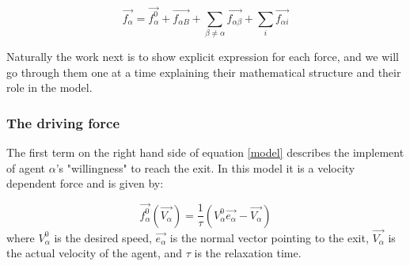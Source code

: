 \begin{equation}\label{model}
    \vec{f_{\alpha}} = \vec{f^{0}_{\alpha}} + \vec{f_{\alpha B}} +
    \sum_{\beta \neq \alpha} \vec{f_{\alpha \beta}} +  
    \sum_{i} \vec{f_{\alpha i}} 
\end{equation}

Naturally the work next is to show explicit expression for each force, and we will go through them one at a time explaining their mathematical structure and their role in the model.\\

\subsubsection{The driving force} %
The first term on the right hand side of equation \eqref{model} describes the implement of agent $ \alpha $'s "willingness" to reach the exit. In this model it is a velocity dependent force 
and is given by:

\begin{equation}\label{relaxtime}
	\vec{f^{0}_{\alpha}}\left( \vec{V_{\alpha}} \right) =
    \frac{1}{\tau}
    \left( V_{\alpha}^{0} \vec{e_{\alpha}} - \vec{V_{\alpha}} \right)
\end{equation}
where $V_{\alpha}^{0}$ is the desired speed, $ \vec{e_{\alpha}} $ is the normal vector pointing to the exit, $\vec{V_{\alpha}}$ is the actual velocity of the agent, and $\tau$ is the relaxation time. \\

